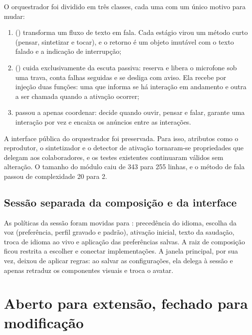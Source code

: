 O orquestrador foi dividido em três classes, cada uma com um único motivo para mudar:

\begin{enumerate}[label=\alph*)]
  \item {} () transforma um fluxo de texto em fala. Cada
        estágio virou um método curto (pensar, sintetizar e tocar), e o retorno é um objeto imutável com o
        texto falado e a indicação de interrupção;
  \item {} () cuida exclusivamente da escuta passiva: reserva
        e libera o microfone sob uma trava, conta falhas seguidas e se desliga com aviso. Ela recebe por
        injeção duas funções: uma que informa se há interação em andamento e outra a ser chamada quando a
        ativação ocorrer;
  \item {} passou a apenas coordenar: decide quando ouvir, pensar e falar, garante uma
        interação por vez e encaixa os anúncios entre as interações.
\end{enumerate}

A interface pública do orquestrador foi preservada. Para isso, atributos como o reprodutor, o
sintetizador e o detector de ativação tornaram-se propriedades que delegam aos colaboradores, e os
testes existentes continuaram válidos sem alteração. O tamanho do módulo caiu de 343 para 255 linhas, e
o método de fala passou de complexidade 20 para 2.

\subsection{Sessão separada da composição e da interface}

As políticas da sessão foram movidas para : precedência do idioma, escolha da
voz (preferência, perfil gravado e padrão), ativação inicial, texto da saudação, troca de idioma ao vivo
e aplicação das preferências salvas. A raiz de composição ficou restrita a escolher e conectar
implementações. A janela principal, por sua vez, deixou de aplicar regras: ao salvar as configurações,
ela delega à sessão e apenas retraduz os componentes visuais e troca o avatar.

\section{Aberto para extensão, fechado para modificação}

